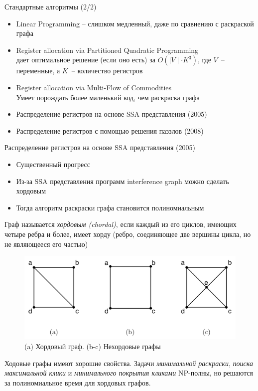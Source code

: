\documentclass[aspectratio=169
  , xcolor={svgnames}
  , hyperref={ colorlinks,citecolor=DeepPink4
             , linkcolor=DarkRed,urlcolor=DarkBlue}
  , russian
  ]{beamer}
\theoremstyle{exerciseStyle1}
\begin{document}
\begin{frame}{Стандартные алгоритмы (2/2)}
\begin{itemize}
\item Linear Programming -- слишком медленный, даже по сравнению с раскраской графа
\item Register allocation via Partitioned Quadratic Programming\\
  дает оптимальное решение (если оно есть) за $O(\mid\!V\!\mid\cdot K^3)$, где $V$~-- переменные, а $K$~-- количество регистров
  
\item Register allocation via Multi-Flow of Commodities\\
  Умеет порождать более маленький код, чем раскраска графа
\item Распределение регистров на основе SSA представления (2005)
\item Распределение регистров с помощью решения паззлов (2008)
\end{itemize}
\end{frame}


\begin{frame}{Распределение регистров на основе SSA представления (2005)}
\begin{itemize}
\item Существенный прогресс
\item Из-за SSA представления программ interference graph можно сделать хордовым
\item Тогда алгоритм раскраски графа становится полиномиальным
\end{itemize}

\begin{definition}
Граф называется \emph{хордовым (chordal)}, если каждый из его циклов, имеющих четыре ребра и более, имеет хорду (ребро, соединяющее две вершины цикла, но не являющееся его частью)
\end{definition}
\end{frame}


\begin{frame}[fragile]{}
\begin{figure}
\centering
\includegraphics[width=0.9\linewidth]{figures/hordes}
\caption{(a) Хордовый граф. (b-c) Нехордовые графы}
\end{figure}


Ходовые графы имеют хорошие свойства. Задачи \emph{минимальной раскраски},
\emph{поиска максимальной клики} и \emph{минимального покрытия кликами} NP-полны, но решаются за полиномиальное время для хордовых графов. 
\end{frame}
\end{document}
